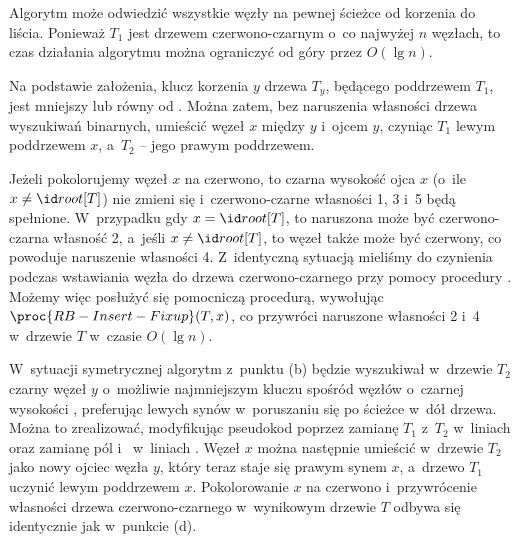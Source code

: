 Algorytm może odwiedzić wszystkie węzły na pewnej ścieżce od korzenia do liścia.
Ponieważ $T_1$ jest drzewem czerwono-czarnym o~co najwyżej $n$ węzłach, to czas działania algorytmu można ograniczyć od góry przez $O(\lg n)$.

\subproblem %
Na podstawie założenia, klucz korzenia $y$ drzewa $T_y$, będącego poddrzewem $T_1$, jest mniejszy lub równy od .
Można zatem, bez naruszenia własności drzewa wyszukiwań binarnych, umieścić węzeł $x$ między $y$ i~ojcem $y$, czyniąc $T_1$ lewym poddrzewem $x$, a~$T_2$ -- jego prawym poddrzewem.

\subproblem %
Jeżeli pokolorujemy węzeł $x$ na czerwono, to czarna wysokość ojca $x$ (o~ile $x\ne\attrib{T}{root}$) nie zmieni się i~czerwono-czarne własności 1, 3 i~5 będą spełnione.
W~przypadku gdy $x=\attrib{T}{root}$, to naruszona może być czerwono-czarna własność 2, a~jeśli $x\ne\attrib{T}{root}$, to węzeł  także może być czerwony, co powoduje naruszenie własności 4.
Z~identyczną sytuacją mieliśmy do czynienia podczas wstawiania węzła do drzewa czerwono-czarnego przy pomocy procedury .
Możemy więc posłużyć się pomocniczą procedurą, wywołując $\proc{RB-Insert-Fixup}(T,x)$, co przywróci naruszone własności 2 i~4 w~drzewie $T$ w~czasie $O(\lg n)$.

\subproblem %
W~sytuacji symetrycznej algorytm z~punktu (b) będzie wyszukiwał w~drzewie $T_2$ czarny węzeł $y$ o~możliwie najmniejszym kluczu spośród węzłów o~czarnej wysokości , preferując lewych synów w~poruszaniu się po ścieżce w~dół drzewa.
Można to zrealizować, modyfikując pseudokod  poprzez zamianę $T_1$ z~$T_2$ w~liniach \doubledash{\ref{li:rb-join-point-initial-node}}{\ref{li:rb-join-point-if-begin}} oraz zamianę pól  i~ w~liniach \doubledash{\ref{li:rb-join-point-if-begin}}{\ref{li:rb-join-point-if-end}}.
Węzeł $x$ można następnie umieścić w~drzewie $T_2$ jako nowy ojciec węzła $y$, który teraz staje się prawym synem $x$, a~drzewo $T_1$ uczynić lewym poddrzewem $x$.
Pokolorowanie $x$ na czerwono i~przywrócenie własności drzewa czerwono-czarnego w~wynikowym drzewie $T$ odbywa się identycznie jak w~punkcie (d).

